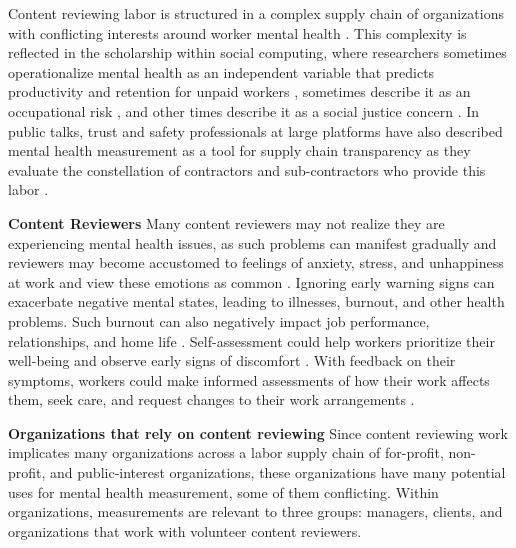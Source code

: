 Content reviewing labor is structured in a complex supply chain of organizations with conflicting interests around worker mental health \cite{roberts_behind_2019}. This complexity is reflected in the scholarship within social computing, where researchers sometimes operationalize mental health as an independent variable that predicts productivity and retention for unpaid workers \cite{schopke-gonzalez_why_2022}, sometimes describe it as an occupational risk \cite{spence_content_2024}, and other times describe it as a social justice concern \cite{steiger_psychological_2021}. In public talks, trust and safety professionals at large platforms have also described mental health measurement as a tool for supply chain transparency as they evaluate the constellation of contractors and sub-contractors who provide this labor \cite{gilbert_what_2022}. 

\textbf{Content Reviewers}
Many content reviewers may not realize they are experiencing mental health issues, as such problems can manifest gradually \cite{Te-Brake2008} and reviewers may become accustomed to feelings of anxiety, stress, and unhappiness at work and view these emotions as common \cite{Te-Brake2008, capel_longitudinal_1991, spence_psychological_2023}. Ignoring early warning signs can exacerbate negative mental states, leading to illnesses, burnout, and other health problems. Such burnout can also negatively impact job performance, relationships, and home life \cite{shirom_discriminant_2003,spence_psychological_2023}. Self-assessment could help workers prioritize their well-being and observe early signs of discomfort \cite{spence_psychological_2023}. With feedback on their symptoms, workers could make informed assessments of how their work affects them, seek care, and request changes to their work arrangements \cite{steiger_psychological_2021,spence_psychological_2023,roberts__2023}. 


\textbf{Organizations that rely on content reviewing}
Since content reviewing work implicates many organizations across a labor supply chain of for-profit, non-profit, and public-interest organizations, these organizations have many potential uses for mental health measurement, some of them conflicting. Within organizations, measurements are relevant to three groups: managers, clients, and organizations that work with volunteer content reviewers.

